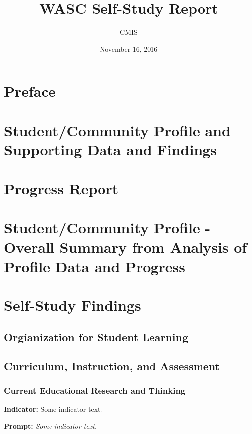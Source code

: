 \documentclass{report}
\title{WASC Self-Study Report}
\date{November 16, 2016}
\author{CMIS}
\begin{document}
\maketitle

\tableofcontents

\chapter{Preface}
\chapter{Student/Community Profile and Supporting Data and Findings}
\chapter{Progress Report}
\chapter[Student/Community Profile Summary]{Student/Community Profile - Overall Summary from Analysis of Profile Data and Progress}
\chapter{Self-Study Findings}
\section{Orgianization for Student Learning}
\section{Curriculum, Instruction, and Assessment}
\subsection{Current Educational Research and Thinking}
\blindtext

\blindtext
 
\noindent\textbf{Indicator:} Some indicator text.

\noindent\textbf{Prompt:} \textit{Some indicator text.}
\end{document}
